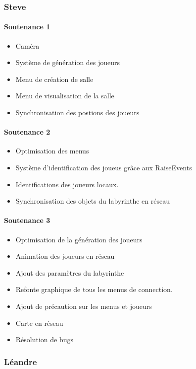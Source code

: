 \documentclass{article}
\begin{document}
\newpage
\subsubsection{Steve}
\paragraph{Soutenance 1}
\begin{itemize}
    \item Caméra
    \item Système de génération des joueurs
    \item Menu de création de salle
    \item Menu de visualisation de la salle
    \item Synchronisation des postions des joueurs
\end{itemize}

\paragraph{Soutenance 2}
\begin{itemize}
    \item Optimisation des menus
    \item Système d'identification des joueus grâce aux RaiseEvents
    \item Identifications des joueurs locaux.
    \item Synchronisation des objets du labyrinthe en réseau
\end{itemize}

\paragraph{Soutenance 3}
\begin{itemize}
    \item Optimisation de la génération des joueurs
    \item Animation des joueurs en réseau
    \item Ajout des paramètres du labyrinthe
    \item Refonte graphique de tous les menus de connection.
    \item Ajout de précaution sur les menus et joueurs
    \item Carte en réseau
    \item Résolution de bugs
\end{itemize}

\newpage
\subsubsection{Léandre}
\end{document}
